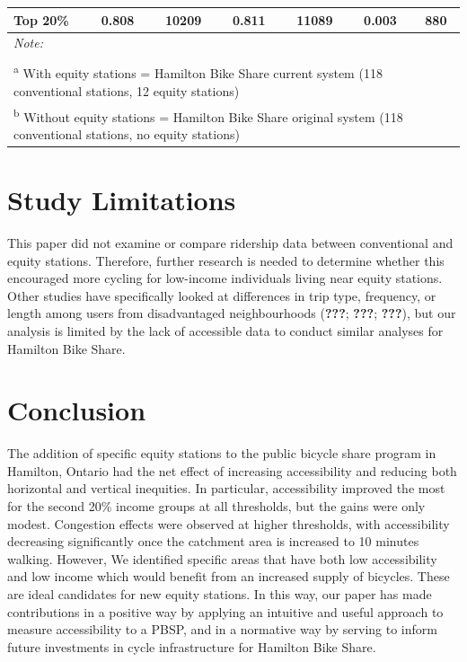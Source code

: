 \documentclass[]{elsarticle} %
\begin{document}
\begin{table}
{\begin{tabular}[t]{lcccccc}
\hspace{1em}Top 20\% & 0.808 & 10209 & 0.811 & 11089 & 0.003 & 880\\
\bottomrule
\multicolumn{7}{l}{\rule{0pt}{1em}\textit{Note: }}\\
\multicolumn{7}{l}{\rule{0pt}{1em} }\\
\multicolumn{7}{l}{\rule{0pt}{1em}\textsuperscript{a} With equity stations = Hamilton Bike Share current system (118 conventional stations, 12 equity stations)}\\
\multicolumn{7}{l}{\rule{0pt}{1em}\textsuperscript{b} Without equity stations = Hamilton Bike Share original system (118 conventional stations, no equity stations)}\\
\end{tabular}}
\end{table}

\hypertarget{study-limitations}{%
\section{Study Limitations}\label{study-limitations}}

This paper did not examine or compare ridership data between
conventional and equity stations. Therefore, further research is needed
to determine whether this encouraged more cycling for low-income
individuals living near equity stations. Other studies have specifically
looked at differences in trip type, frequency, or length among users
from disadvantaged neighbourhoods ({\textbf{???}}; {\textbf{???}};
{\textbf{???}}), but our analysis is limited by the lack of accessible
data to conduct similar analyses for Hamilton Bike Share.

\hypertarget{conclusion}{%
\section{Conclusion}\label{conclusion}}

The addition of specific equity stations to the public bicycle share
program in Hamilton, Ontario had the net effect of increasing
accessibility and reducing both horizontal and vertical inequities. In
particular, accessibility improved the most for the second 20\% income
groups at all thresholds, but the gains were only modest. Congestion
effects were observed at higher thresholds, with accessibility
decreasing significantly once the catchment area is increased to 10
minutes walking. However, We identified specific areas that have both
low accessibility and low income which would benefit from an increased
supply of bicycles. These are ideal candidates for new equity stations.
In this way, our paper has made contributions in a positive way by
applying an intuitive and useful approach to measure accessibility to a
PBSP, and in a normative way by serving to inform future investments in
cycle infrastructure for Hamilton Bike Share.
\end{document}
